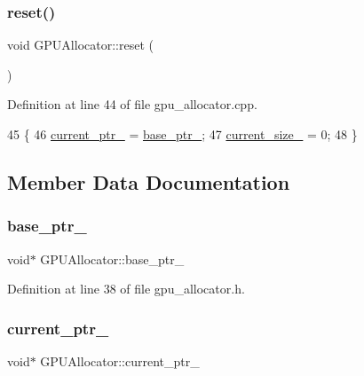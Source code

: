 \subsubsection{\texorpdfstring{reset()}{reset()}}
{\footnotesize\ttfamily void G\+P\+U\+Allocator\+::reset (\begin{DoxyParamCaption}{ }\end{DoxyParamCaption})}



Definition at line 44 of file gpu\+\_\+allocator.\+cpp.


\begin{DoxyCode}
45 \{
46     \mbox{\hyperlink{class_g_p_u_allocator_a34ef0b84f1e5a510c4c968889b2dbf04}{current\_ptr\_}} = \mbox{\hyperlink{class_g_p_u_allocator_a3c2b70c86a428b4265771f9845307d0a}{base\_ptr\_}};
47     \mbox{\hyperlink{class_g_p_u_allocator_a8d404f40928c431ced08c013189c8c58}{current\_size\_}} = 0;
48 \}
\end{DoxyCode}


\subsection{Member Data Documentation}
\mbox{\label{class_g_p_u_allocator_a3c2b70c86a428b4265771f9845307d0a}} 
\subsubsection{\texorpdfstring{base\+\_\+ptr\+\_\+}{base\_ptr\_}}
{\footnotesize\ttfamily void$\ast$ G\+P\+U\+Allocator\+::base\+\_\+ptr\+\_\+\hspace{0.3cm}{\ttfamily [private]}}



Definition at line 38 of file gpu\+\_\+allocator.\+h.

\mbox{\label{class_g_p_u_allocator_a34ef0b84f1e5a510c4c968889b2dbf04}} 
\subsubsection{\texorpdfstring{current\+\_\+ptr\+\_\+}{current\_ptr\_}}
{\footnotesize\ttfamily void$\ast$ G\+P\+U\+Allocator\+::current\+\_\+ptr\+\_\+\hspace{0.3cm}{\ttfamily [private]}}




